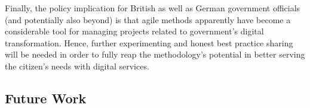 Finally, the policy implication for British as well as German government officials (and potentially also beyond) is that agile methods apparently have become a considerable tool for managing projects related to government's digital transformation. Hence, further experimenting and honest best practice sharing will be needed in order to fully reap the methodology's potential in better serving the citizen's needs with digital services. 

\subsection{Future Work}















